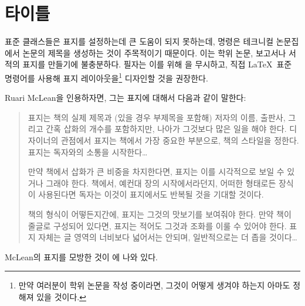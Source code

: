 \documentclass[10pt,a4paper]{oblivoir}
\begin{document}


\setlength{\absparindent}{0pt}
\begin{abstract}
  \lipsum[1]
\end{abstract}

\chapter{타이틀}

표준 클래스들은 표지를 설정하는데 큰 도움이 되지 못하는데, \cmd{\maketitle}
명령은 테크니컬 논문집에서 논문의 제목을 생성하는 것이 주목적이기 때문이다.
이는 학위 논문, 보고서나 서적의 표지를 만들기에 불충분하다.
필자는 이를 위해 \cmd{\maketitle}을 무시하고, 직접 \LaTeX\ 표준 명령어를
사용해 표지 레이아웃을\footnote{만약 여러분이 학위 논문을 작성 중이라면, 그것이
어떻게 생겨야 하는지 아마도 정해져 있을 것이다.}
디자인할 것을 권장한다.

Ruari McLean을 인용하자면, 그는 표지에 대해서 다음과 같이 말한다:
\begin{quotation}
  표지는 책의 실제 제목과 (있을 경우 부제목을 포함해) 저자의 이름, 출판사,
  그리고 간혹 삽화의 개수를 포함하지만, 나아가 그것보다 많은 일을 해야 한다.
  디자이너의 관점에서 표지는 책에서 가장 중요한 부분으로, 책의 스타일을 정한다.
  표지는 독자와의 소통을 시작한다\ldots

  만약 책에서 삽화가 큰 비중을 차지한다면, 표지는 이를 시각적으로 보일 수
  있거나 그래야 한다.
  책에서, 예컨대 장의 시작에서라던지, 어떠한 형태로든 장식이 사용된다면 독자는
  이것이 표지에서도 반복될 것을 기대할 것이다.

  책의 형식이 어떻든지간에, 표지는 그것의 맛보기를 보여줘야 한다.
  만약 책이 줄글로 구성되어 있다면, 표지는 적어도 그것과 조화를 이룰 수 있어야
  한다.
  표지 자체는 글 영역의 너비보다 넓어서는 안되며, 일반적으로는 더 좁을
  것이다\ldots
\end{quotation}

McLean의 표지를 모방한 것이 에 나와 있다.
\end{document}
